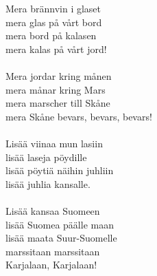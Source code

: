 
Mera brännvin i glaset \\ mera glas på vårt bord \\ mera bord på kalasen \\ mera kalas på vårt jord! \\ \hspace{10mm} \\ Mera jordar kring månen \\ mera månar kring Mars \\ mera marscher till Skåne \\ mera Skåne bevars, bevars, bevars! \\ \hspace{10mm} \\ Lisää viinaa mun lasiin \\ lisää laseja pöydille \\ lisää pöytiä näihin juhliin \\ lisää juhlia kansalle. \\ \hspace{10mm} \\ Lisää kansaa Suomeen \\ lisää Suomea päälle maan \\ lisää maata Suur-Suomelle \\ marssitaan marssitaan \\ Karjalaan, Karjalaan!